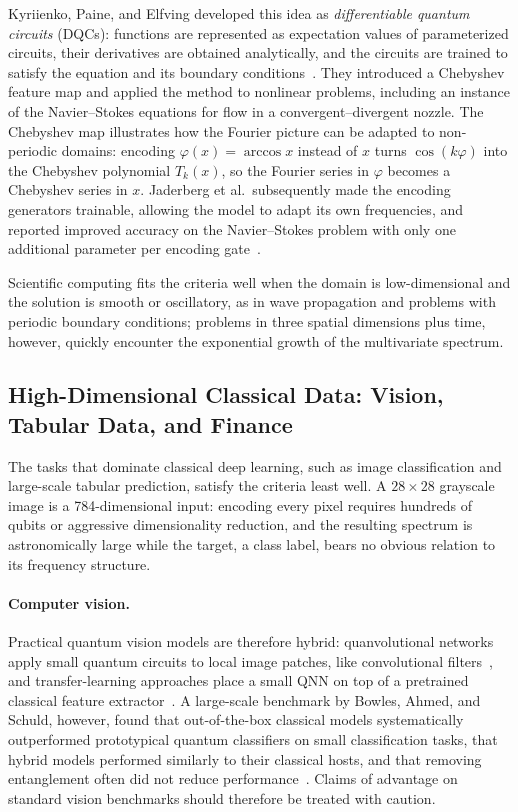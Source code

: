 \documentclass[12pt]{article}
\numberwithin{equation}{section}  %
\begin{document}
Kyriienko, Paine, and Elfving developed this idea as \emph{differentiable quantum circuits} (DQCs): functions are represented as expectation values of parameterized circuits, their derivatives are obtained analytically, and the circuits are trained to satisfy the equation and its boundary conditions~\cite{kyriienko2021solving}. They introduced a Chebyshev feature map and applied the method to nonlinear problems, including an instance of the Navier--Stokes equations for flow in a convergent--divergent nozzle. The Chebyshev map illustrates how the Fourier picture can be adapted to non-periodic domains: encoding $\varphi(x) = \arccos x$ instead of $x$ turns $\cos(k\varphi)$ into the Chebyshev polynomial $T_k(x)$, so the Fourier series in $\varphi$ becomes a Chebyshev series in $x$. Jaderberg et al.\ subsequently made the encoding generators trainable, allowing the model to adapt its own frequencies, and reported improved accuracy on the Navier--Stokes problem with only one additional parameter per encoding gate~\cite{jaderberg2023let}.

Scientific computing fits the criteria well when the domain is low-dimensional and the solution is smooth or oscillatory, as in wave propagation and problems with periodic boundary conditions; problems in three spatial dimensions plus time, however, quickly encounter the exponential growth of the multivariate spectrum.

\subsection{High-Dimensional Classical Data: Vision, Tabular Data, and Finance}
\label{sec:app_highdim}

The tasks that dominate classical deep learning, such as image classification and large-scale tabular prediction, satisfy the criteria least well. A $28 \times 28$ grayscale image is a 784-dimensional input: encoding every pixel requires hundreds of qubits or aggressive dimensionality reduction, and the resulting spectrum is astronomically large while the target, a class label, bears no obvious relation to its frequency structure.

\paragraph{Computer vision.} Practical quantum vision models are therefore hybrid: quanvolutional networks apply small quantum circuits to local image patches, like convolutional filters~\cite{henderson2020quanvolutional}, and transfer-learning approaches place a small QNN on top of a pretrained classical feature extractor~\cite{mari2020transfer}. A large-scale benchmark by Bowles, Ahmed, and Schuld, however, found that out-of-the-box classical models systematically outperformed prototypical quantum classifiers on small classification tasks, that hybrid models performed similarly to their classical hosts, and that removing entanglement often did not reduce performance~\cite{bowles2024better}. Claims of advantage on standard vision benchmarks should therefore be treated with caution.
\end{document}

